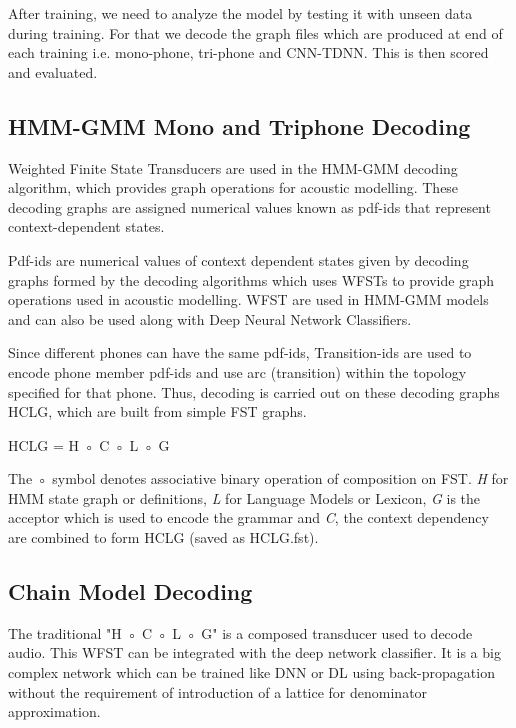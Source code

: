 After training, we need to analyze the model by testing it with unseen data during training. For that we decode the graph files which are produced at end of each training i.e. mono-phone, tri-phone and CNN-TDNN. This is then scored and evaluated.

\subsection{HMM-GMM Mono and Triphone Decoding}
Weighted Finite State Transducers are used in the HMM-GMM decoding algorithm, which provides graph operations for acoustic modelling. These decoding graphs are assigned numerical values known as pdf-ids that represent context-dependent states. 

Pdf-ids are numerical values of context dependent states given by decoding graphs formed by the decoding algorithms which uses WFSTs to provide graph operations used in acoustic modelling. WFST are used in HMM-GMM models and can also be used along with Deep Neural Network Classifiers.

Since different phones can have the same pdf-ids, Transition-ids are used to encode phone member pdf-ids and use arc (transition) within the topology specified for that phone. Thus, decoding is carried out on these decoding graphs HCLG, which are built from simple FST graphs. %
\vspace{11pt}

\begin{center}
HCLG = H ◦ C ◦ L ◦ G    
\end{center}
\vspace{11pt}

The ◦ symbol denotes associative binary operation of composition on FST. \textit{H} for HMM state graph or definitions, \textit{L} for Language Models or Lexicon, \textit{G} is the acceptor which is used to encode the grammar and \textit{C}, the context dependency are combined to form HCLG (saved as HCLG.fst). 
\vspace{11pt}

\subsection{Chain Model Decoding}

The traditional "H ◦ C ◦ L ◦ G" is a composed transducer used to decode audio. This WFST can be integrated with the deep network classifier. It is a big complex network which can be trained like DNN or DL using back-propagation without the requirement of introduction of a lattice for denominator approximation. 


